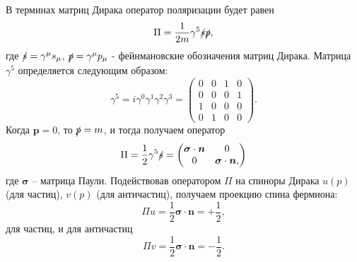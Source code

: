 \documentclass{extarticle}
\begin{document}
В терминах матриц Дирака оператор поляризации будет равен
\begin{equation}
	\Pi = \frac{1}{2m} \gamma^5 \slashed{s} \slashed{p}, 
\end{equation}
где $\slashed{s} = \gamma^\mu s_\mu$, $\slashed{p} = \gamma^\mu p_\mu$ - фейнмановские обозначения матриц Дирака. Матрица $\gamma^5$ определяется следующим образом:
\begin{equation}
	\gamma^5 = i \gamma^0 \gamma^1 \gamma^2 \gamma^3 = \begin{pmatrix}
		0 &  0 & 1 & 0 \\
		0 & 0 & 0 & 1 \\
		1 & 0 & 0 & 0 \\
		0 & 1 & 0 & 0
	\end{pmatrix}.
\end{equation}
Когда $\textbf{p}=0$, то $\slashed{p} = m$, и тогда получаем оператор
\begin{equation}
	\Pi = \frac{1}{2} \gamma^5 \slashed{s} = \begin{pmatrix}
		\boldsymbol{\sigma} \cdot \boldsymbol{n} & 0 \\ 0 & \boldsymbol{\sigma} \cdot \boldsymbol{n},
	\end{pmatrix}
\end{equation}
где $\boldsymbol{\sigma}$ -- матрица Паули. Подействовав оператором $\Pi$ на спиноры Дирака $u(p)$ (для частиц), $v(p)$ (для античастиц), получаем проекцию спина фермиона:
\begin{equation}
	\Pi u = \frac{1}{2} \boldsymbol{\sigma} \cdot \boldsymbol{n} = + \frac{1}{2}, 
\end{equation}
для частиц, и для античастиц
\begin{equation}
	\Pi v = \frac{1}{2} \boldsymbol{\sigma} \cdot \boldsymbol{n} = - \frac{1}{2}.
\end{equation}
\end{document}
